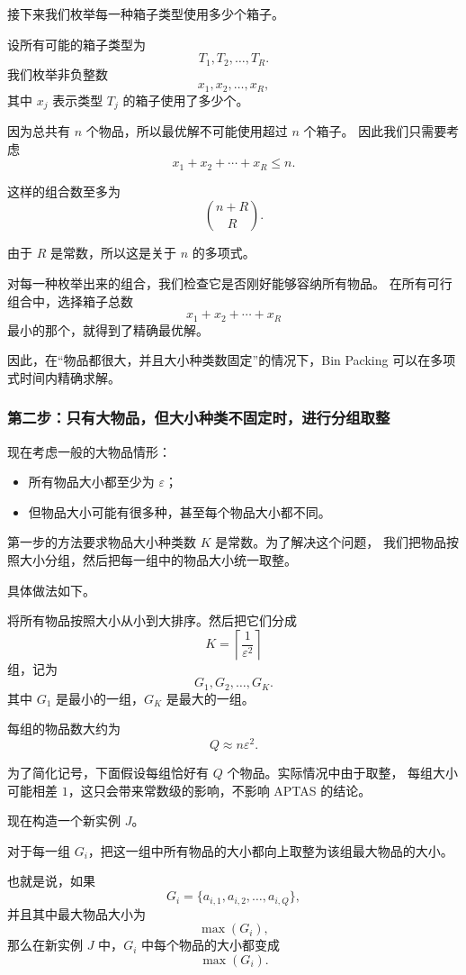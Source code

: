 \documentclass[UTF8,openany,12pt]{ctexbook}
\theoremstyle{remark}
\begin{document}
接下来我们枚举每一种箱子类型使用多少个箱子。

设所有可能的箱子类型为
\[
  T_1,T_2,\dots,T_R.
\]
我们枚举非负整数
\[
  x_1,x_2,\dots,x_R,
\]
其中 $x_j$ 表示类型 $T_j$ 的箱子使用了多少个。

因为总共有 $n$ 个物品，所以最优解不可能使用超过 $n$ 个箱子。
因此我们只需要考虑
\[
  x_1+x_2+\cdots+x_R\le n.
\]

这样的组合数至多为
\[
  \binom{n+R}{R}.
\]

由于 $R$ 是常数，所以这是关于 $n$ 的多项式。

对每一种枚举出来的组合，我们检查它是否刚好能够容纳所有物品。
在所有可行组合中，选择箱子总数
\[
  x_1+x_2+\cdots+x_R
\]
最小的那个，就得到了精确最优解。

因此，在“物品都很大，并且大小种类数固定”的情况下，Bin Packing 可以在多项式时间内精确求解。

\subsubsection*{第二步：只有大物品，但大小种类不固定时，进行分组取整}

现在考虑一般的大物品情形：

\begin{itemize}
  \item 所有物品大小都至少为 $\varepsilon$；
  \item 但物品大小可能有很多种，甚至每个物品大小都不同。
\end{itemize}

第一步的方法要求物品大小种类数 $K$ 是常数。为了解决这个问题，
我们把物品按照大小分组，然后把每一组中的物品大小统一取整。

具体做法如下。

将所有物品按照大小从小到大排序。然后把它们分成
\[
  K=\left\lceil \frac{1}{\varepsilon^2}\right\rceil
\]
组，记为
\[
  G_1,G_2,\dots,G_K.
\]
其中 $G_1$ 是最小的一组，$G_K$ 是最大的一组。

每组的物品数大约为
\[
  Q\approx n\varepsilon^2.
\]

为了简化记号，下面假设每组恰好有 $Q$ 个物品。实际情况中由于取整，
每组大小可能相差 $1$，这只会带来常数级的影响，不影响 APTAS 的结论。

现在构造一个新实例 $J$。

对于每一组 $G_i$，把这一组中所有物品的大小都向上取整为该组最大物品的大小。

也就是说，如果
\[
  G_i=\{a_{i,1},a_{i,2},\dots,a_{i,Q}\},
\]
并且其中最大物品大小为
\[
  \max(G_i),
\]
那么在新实例 $J$ 中，$G_i$ 中每个物品的大小都变成
\[
  \max(G_i).
\]
\end{document}
